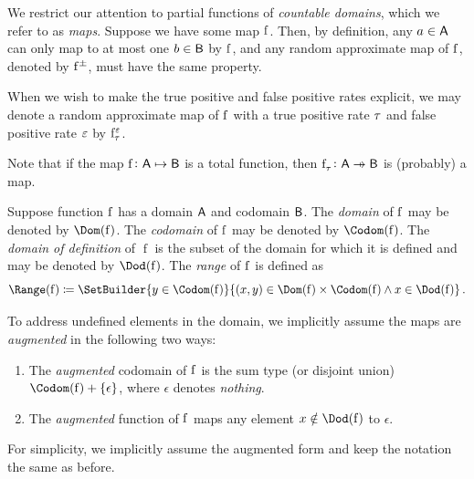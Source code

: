 \documentclass[11pt,final,hidelinks]{article}
\begin{document}
We restrict our attention to partial functions of \emph{countable domains}, which we refer to as \emph{maps}.
Suppose we have some map $\PFun{f}$. Then, by definition, any $a \in \Set{A}$ can only map to at most one $b \in \Set{B}$ by $\PFun{f}$, and any random approximate map of $\PFun{f}$, denoted by $\APFun{f}$, must have the same property.

\begin{notation}
	When we wish to make the true positive and false positive rates explicit, we may denote a random approximate map of $\PFun{f}$ with a true positive rate $\tau$ and false positive rate $\varepsilon$ by $\APFun{f}[\tprate][\fprate]$.
\end{notation}
Note that if the map $\PFun{f} \colon \Set{A} \mapsto \Set{B}$ is a total function, then $\APFun{f}[\tprate][] \colon \Set{A} \pfun \Set{B} $ is (probably) a map.

Suppose function $\PFun{f}$ has a domain $\Set{A}$ and codomain $\Set{B}$.
The \emph{domain} of $\PFun{f}$ may be denoted by $\Dom(\PFun{f})$.
The \emph{codomain} of $\PFun{f}$ may be denoted by $\Codom(\PFun{f})$.
The \emph{domain of definition} of $\operatorname{f}$ is the subset of the domain for which it is defined and may be denoted by $\Dod(\PFun{f})$.
The \emph{range} of $\PFun{f}$ is defined as
\begin{equation}
\Range(\PFun{f}) \coloneqq
\SetBuilder{y \in \Codom(\PFun{f})}{(x,y) \in \Dom(\PFun{f}) \times \Codom(\PFun{f}) \land x \in \Dod(\PFun{f})}\,.
\end{equation}

To address undefined elements in the domain, we implicitly assume the maps are \emph{augmented} in the following two ways:
\begin{enumerate}
	\item The \emph{augmented} codomain of $\PFun{f}$ is the sum type (or disjoint union) $\Codom(\PFun{f}) + \{\epsilon\}$, where $\epsilon$ denotes \emph{nothing}.
	\item The \emph{augmented} function of $\PFun{f}$ maps any element $x \notin \Dod(\PFun{f})$ to $\epsilon$.
\end{enumerate}
For simplicity, we implicitly assume the augmented form and keep the notation the same as before.

\end{document}
